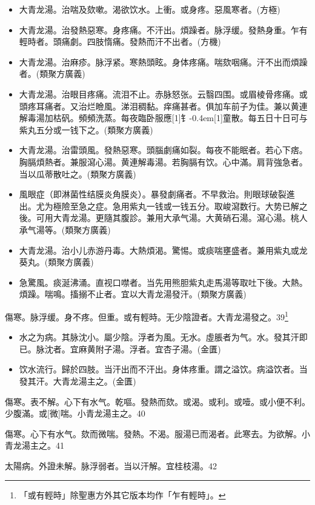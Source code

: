 \documentclass[11pt,oneside,b5paper]{ctexbook}
\begin{document}
\begin{flushleft}
\begin{itemize}
\item 大青龙湯。治喘及欬嗽。渴欲饮水。上衝。或身疼。惡風寒者。(方極)
\item 大青龙湯。治發熱惡寒。身疼痛。不汗出。煩躁者。脉浮缓。發熱身重。乍有輕時者。頭痛劇。四肢惰痛。發熱而汗不出者。(方機)
\item 大青龙湯。治麻疹。脉浮紧。寒熱頭眩。身体疼痛。喘欬咽痛。汗不出而煩躁者。(類聚方廣義)
\item 大青龙湯。治眼目疼痛。流泪不止。赤脉怒张。云翳四围。或眉棱骨疼痛。或頭疼耳痛者。又治烂瞼風。涕泪稠黏。痒痛甚者。俱加车前子为佳。兼以黄連解毒湯加枯矾。頻頻洗蒸。每夜臨卧服應{\hbox{\scalebox{0.7}[1]{钅}\kern-0.4em\scalebox{0.7}[1]{童}}}散。每五日十日可与紫丸五分或一钱下之。(類聚方廣義)
\item 大青龙湯。治雷頭風。發熱惡寒。頭腦劇痛如裂。每夜不能眠者。若心下痞。胸膈煩熱者。兼服瀉心湯。黄連解毒湯。若胸膈有饮。心中滿。肩背強急者。当以瓜蒂散吐之。(類聚方廣義)
\item 風眼症（即淋菌性结膜炎角膜炎）。暴發劇痛者。不早救治。則眼球破裂進出。尤为極險至急之症。急用紫丸一钱或一钱五分。取峻瀉数行。大势已解之後。可用大青龙湯。更隨其腹診。兼用大承气湯。大黄硝石湯。瀉心湯。桃人承气湯等。(類聚方廣義)
\item 大青龙湯。治小儿赤游丹毒。大熱煩渴。驚惕。或痰喘壅盛者。兼用紫丸或龙葵丸。(類聚方廣義)
\item 急驚風。痰涎沸涌。直视口噤者。当先用熊胆紫丸走馬湯等取吐下後。大熱。煩躁。喘鳴。搐搦不止者。宜以大青龙湯發汗。(類聚方廣義)
\end{itemize}

傷寒。脉浮缓。身不疼。但重。或有輕時。无少陰證者。大青龙湯發之。39\footnote{「或有輕時」除聖惠方外其它版本均作「乍有輕時」。}

\begin{itemize}
\item 水之为病。其脉沈小。屬少陰。浮者为風。无水。虛脹者为气。水。發其汗即已。脉沈者。宜麻黄附子湯。浮者。宜杏子湯。(金匱)
\item 饮水流行。歸於四肢。当汗出而不汗出。身体疼重。謂之溢饮。病溢饮者。当發其汗。大青龙湯主之。(金匱)
\end{itemize}

傷寒。表不解。心下有水气。乾嘔。發熱而欬。或渴。或利。或噎。或小便不利。少腹滿。或[微]喘。小青龙湯主之。40

傷寒。心下有水气。欬而微喘。發熱。不渴。服湯已而渴者。此寒去。为欲解。小青龙湯主之。41

太陽病。外證未解。脉浮弱者。当以汗解。宜桂枝湯。42


\end{flushleft}
\end{document}

